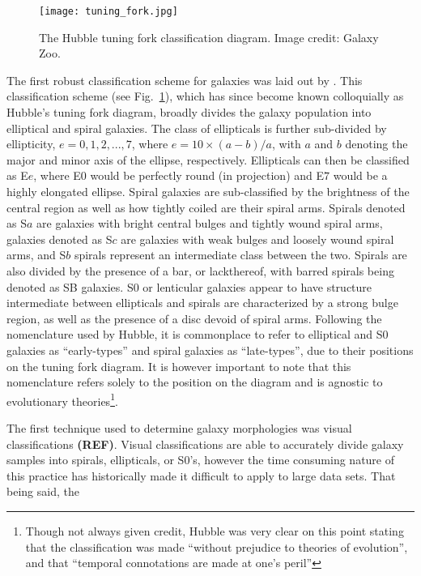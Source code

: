 \begin{figure}[!ht]
  \centering
  \texttt{[image: tuning\_fork.jpg]}
  \caption{The Hubble tuning fork classification diagram.  Image
    credit: Galaxy Zoo.}
  \label{fig:tuning_fork}
\end{figure}

The first robust classification scheme for galaxies was laid out by
\citet{hubble1926}.  This classification scheme (see
Fig.~\ref{fig:tuning_fork}), which has since become known colloquially
as Hubble's tuning fork diagram, broadly divides the galaxy
population into elliptical and spiral galaxies.  The class of
ellipticals is further sub-divided by ellipticity, $e = 0,1,2,...,7$,
where $e = 10 \times (a-b)/a$, with $a$ and $b$ denoting the major and
minor axis of the ellipse, respectively.  Ellipticals can then be
classified as E$e$, where E$0$ would be perfectly round (in
projection) and E$7$ would be a highly elongated ellipse.  Spiral
galaxies are sub-classified by the brightness of the central region as
well as how tightly coiled are their spiral arms.  Spirals denoted as
S$a$ are galaxies with bright central bulges and tightly wound spiral
arms, galaxies denoted as S$c$ are galaxies with weak bulges and
loosely wound spiral arms, and S$b$ spirals represent an intermediate
class between the two.  Spirals are also divided by the presence of a
bar, or lackthereof, with barred spirals being denoted as SB galaxies.
S$0$ or lenticular galaxies appear to have structure intermediate
between ellipticals and spirals are characterized by a strong bulge
region, as well as the presence of a disc devoid of spiral arms.
Following the nomenclature used by Hubble, it is commonplace to refer
to elliptical and S0 galaxies as ``early-types'' and spiral galaxies
as ``late-types'', due to their positions on the tuning fork diagram.
It is however important to note that this nomenclature refers solely
to the position on the diagram and is agnostic to evolutionary
theories\footnote{Though not always given credit, Hubble was
  very clear on this point stating that the classification was made
  ``without prejudice to theories of evolution'', and that ``temporal
  connotations are made at one's peril''}.
\par
The first technique used to determine galaxy morphologies was visual
classifications \textbf{(REF)}.  Visual classifications are able to
accurately divide galaxy samples into spirals, ellipticals, or S0's,
however the time consuming nature of this practice has historically
made it difficult to apply to large data sets.  That being said, the
